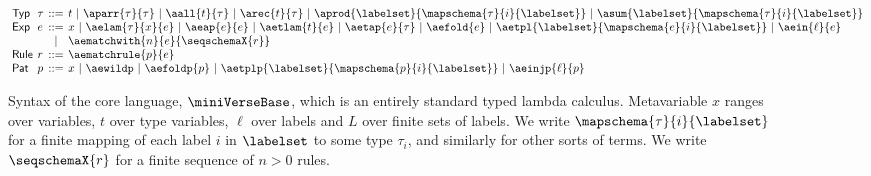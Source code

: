 \documentclass[acmsmall]{acmart}
\begin{document}
\begin{figure}
\begin{minipage}{\textwidth}
\small
$\arraycolsep=2pt\begin{array}{llcl}
\mathsf{Typ} & \tau & ::= & t ~\vert~ \aparr{\tau}{\tau} ~\vert~ \aall{t}{\tau} ~\vert~ \arec{t}{\tau} ~\vert~ \aprod{\labelset}{\mapschema{\tau}{i}{\labelset}} ~\vert~ \asum{\labelset}{\mapschema{\tau}{i}{\labelset}}\\
\mathsf{Exp} & e & ::= & x ~\vert~ \aelam{\tau}{x}{e} ~\vert~ \aeap{e}{e} ~\vert~ \aetlam{t}{e} ~\vert~ \aetap{e}{\tau} ~\vert~ \aefold{e} ~\vert~ \aetpl{\labelset}{\mapschema{e}{i}{\labelset}} ~\vert~  \aein{\ell}{e} \\
& & \vert & \aematchwith{n}{e}{\seqschemaX{r}}\\
\mathsf{Rule} & r & ::= & \aematchrule{p}{e}\\
\mathsf{Pat} & p & ::= & x  ~\vert~ \aewildp ~\vert~ \aefoldp{p} ~\vert~ \aetplp{\labelset}{\mapschema{p}{i}{\labelset}} ~\vert~ \aeinjp{\ell}{p}
\end{array}$
\end{minipage}
\caption[Syntax of the core language of $\miniVersePat$]{Syntax of the core language, $\miniVerseBase$, which is an entirely standard typed lambda calculus.  Metavariable $x$ ranges over variables, $t$ over type variables, $\ell$ over labels and $L$ over finite sets of labels. We write $\mapschema{\tau}{i}{\labelset}$ for a finite mapping of each label $i$ in $\labelset$ to some type $\tau_i$, and similarly for other sorts of terms. We write $\seqschemaX{r}$ for a finite sequence of $n > 0$  rules. %
}
\label{fig:U-expanded-terms}
\end{figure}
\end{document}
